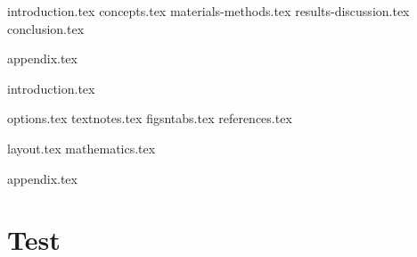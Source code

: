 \documentclass[
    a4paper, 				%
    fontsize=11pt, 			%
    twoside=true, 			%
	numbers=noenddot, 		%
	fontmethod=modern, 		%
	BCOR=10mm,				%
]{kaobook}
\begin{document}
\listoflstlistings %

\endgroup


\mainmatter{} %

{introduction.tex}
{concepts.tex}
{materials-methods.tex}
{results-discussion.tex}
{conclusion.tex}

\appendix %


{appendix.tex}

{introduction.tex}

{options.tex}
{textnotes.tex}
{figsntabs.tex}
{references.tex}


{layout.tex}
{mathematics.tex}

\appendix %


{appendix.tex}

\chapter{Test}
\blindtext{}


\backmatter %
\end{document}

